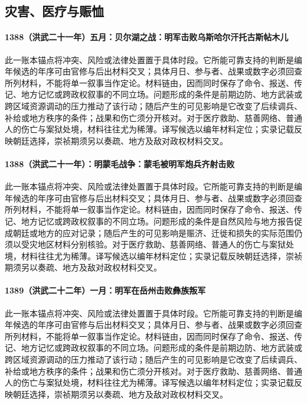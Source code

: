 \subsection{灾害、医疗与赈恤}

\paragraph{1388（洪武二十一年）五月：贝尔湖之战：明军击败乌斯哈尔汗托古斯帖木儿} 此一账本锚点将冲突、风险或法律处置置于具体时段。它所能可靠支持的判断是编年候选的年序可由官修与后出材料交叉；具体月日、参与者、战果或数字必须回查所列材料，不能将单一叙事当作定论。材料链由，因而同时保存了命令、报送、传记、地方记忆或跨政权叙事的不同立场。问题形成的条件是前期边防、地方武装或跨区域资源调动的压力推动了该行动；随后产生的可见影响是它改变了后续调兵、补给或地方秩序的条件；战果和伤亡须分开核对。对于医疗救助、慈善网络、普通人的伤亡与案狱处境，材料往往尤为稀薄。译写候选以编年材料定位；实录记载反映朝廷选择，崇祯期须另以奏疏、地方及敌对政权材料交叉。

\paragraph{1388（洪武二十一年）：明蒙毛战争：蒙毛被明军炮兵齐射击败} 此一账本锚点将冲突、风险或法律处置置于具体时段。它所能可靠支持的判断是编年候选的年序可由官修与后出材料交叉；具体月日、参与者、战果或数字必须回查所列材料，不能将单一叙事当作定论。材料链由，因而同时保存了命令、报送、传记、地方记忆或跨政权叙事的不同立场。问题形成的条件是自然风险与地方报告促成朝廷或地方的应对记录；随后产生的可见影响是赈济、迁徙和损失的实际范围仍须以受灾地区材料分别核验。对于医疗救助、慈善网络、普通人的伤亡与案狱处境，材料往往尤为稀薄。译写候选以编年材料定位；实录记载反映朝廷选择，崇祯期须另以奏疏、地方及敌对政权材料交叉。

\paragraph{1389（洪武二十二年）一月：明军在岳州击败彝族叛军} 此一账本锚点将冲突、风险或法律处置置于具体时段。它所能可靠支持的判断是编年候选的年序可由官修与后出材料交叉；具体月日、参与者、战果或数字必须回查所列材料，不能将单一叙事当作定论。材料链由，因而同时保存了命令、报送、传记、地方记忆或跨政权叙事的不同立场。问题形成的条件是前期边防、地方武装或跨区域资源调动的压力推动了该行动；随后产生的可见影响是它改变了后续调兵、补给或地方秩序的条件；战果和伤亡须分开核对。对于医疗救助、慈善网络、普通人的伤亡与案狱处境，材料往往尤为稀薄。译写候选以编年材料定位；实录记载反映朝廷选择，崇祯期须另以奏疏、地方及敌对政权材料交叉。

